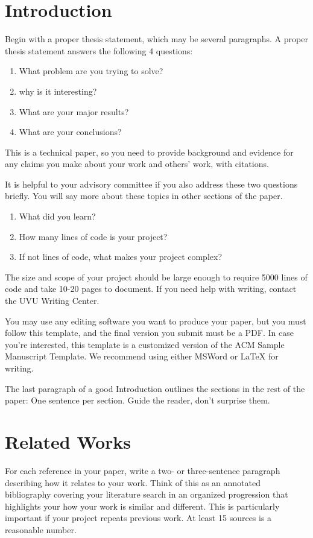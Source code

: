 \documentclass[acmlarge,screen]{acmart}
\begin{document}
\section{Introduction}
Begin with a proper thesis statement, which may be several paragraphs. A proper thesis statement
answers the following 4 questions:
\begin{enumerate}
      \item What problem are you trying to solve?
      \item why is it interesting?
      \item What are your major results?
      \item What are your conclusions?
\end{enumerate}
This is a technical paper, so you need to provide background and evidence for any claims you
make about your work and others' work, with citations.

It is helpful to your advisory committee if you also address these
two questions briefly. You will say more about these topics in other sections of the paper.
\begin{enumerate}
      \item What did you learn?
      \item How many lines of code is your project?
      \item If not lines of code, what makes your project complex?
\end{enumerate}

The size and scope of your project should be large enough to require 
5000 lines of code and take 10-20 pages to document. If you need help with writing, 
contact the UVU Writing Center.

You may use any editing software you want to produce your paper, but you must follow this 
template, and the final version you submit must be a PDF. In case you're interested, this template 
is a customized version of the ACM Sample Manuscript Template. We recommend using either 
MSWord or LaTeX for writing.

The last paragraph of a good Introduction outlines the sections in the
rest of the paper: One sentence per section. Guide the reader, don't surprise them.

\section{Related Works}
For each reference in your paper, write a two- or three-sentence paragraph 
describing how it relates to your work. Think of this as an annotated bibliography
covering your literature search in an organized progression that highlights your 
how your work is similar and different. This is particularly important if your project repeats
previous work. At least 15 sources is a reasonable number.
\end{document}
